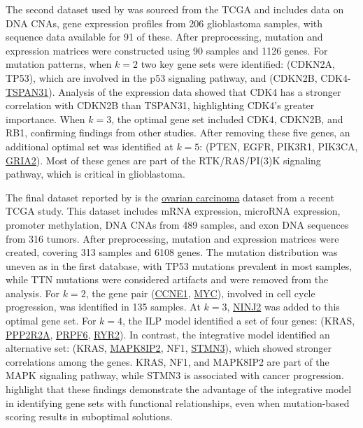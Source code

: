 The second dataset used by \textcite{mdpfinder} was sourced from the TCGA \cite{tcga} and includes data on DNA CNAs, gene expression profiles from 206 glioblastoma samples, with sequence data available for 91 of these. After preprocessing, mutation and expression matrices were constructed using 90 samples and 1126 genes. For mutation patterns, when $k = 2$ two key gene sets were identified: (CDKN2A, TP53), which are involved in the p53 signaling pathway, and (CDKN2B, CDK4-\href{https://www.ncbi.nlm.nih.gov/gene/6302}{TSPAN31}). Analysis of the expression data showed that CDK4 has a stronger correlation with CDKN2B than TSPAN31, highlighting CDK4's greater importance. When $k = 3$, the optimal gene set included CDK4, CDKN2B, and RB1, confirming findings from other studies. After removing these five genes, an additional optimal set was identified at $k = 5$: (PTEN, EGFR, PIK3R1, PIK3CA, \href{https://www.ncbi.nlm.nih.gov/gene/2891}{GRIA2}). Most of these genes are part of the RTK/RAS/PI(3)K signaling pathway, which is critical in glioblastoma.

The final dataset reported by \textcite{mdpfinder} is the \href{https://en.wikipedia.org/wiki/Ovarian_cancer}{ovarian carcinoma} dataset from a recent TCGA study. This dataset includes mRNA expression, microRNA expression, promoter methylation, DNA CNAs from 489 samples, and exon DNA sequences from 316 tumors. After preprocessing, mutation and expression matrices were created, covering 313 samples and 6108 genes. The mutation distribution was uneven as in the first database, with TP53 mutations prevalent in most samples, while TTN mutations were considered artifacts and were removed from the analysis. For $k=2$, the gene pair (\href{https://www.ncbi.nlm.nih.gov/gene/898}{CCNE1}, \href{https://www.ncbi.nlm.nih.gov/gene/4609}{MYC}), involved in cell cycle progression, was identified in 135 samples. At $k=3$, \href{https://www.ncbi.nlm.nih.gov/gene/4815}{NINJ2} was added to this optimal gene set. For $k=4$, the ILP model identified a set of four genes: (KRAS, \href{https://www.ncbi.nlm.nih.gov/gene/5520}{PPP2R2A}, \href{https://www.ncbi.nlm.nih.gov/gene/24148}{PRPF6}, \href{https://www.ncbi.nlm.nih.gov/gene/6262}{RYR2}). In contrast, the integrative model identified an alternative set: (KRAS, \href{https://www.ncbi.nlm.nih.gov/gene/23542}{MAPK8IP2}, NF1, \href{https://www.ncbi.nlm.nih.gov/gene/50861}{STMN3}), which showed stronger correlations among the genes. KRAS, NF1, and MAPK8IP2 are part of the MAPK signaling pathway, while STMN3 is associated with cancer progression. \textcite{mdpfinder} highlight that these findings demonstrate the advantage of the integrative model in identifying gene sets with functional relationships, even when mutation-based scoring results in suboptimal solutions.

